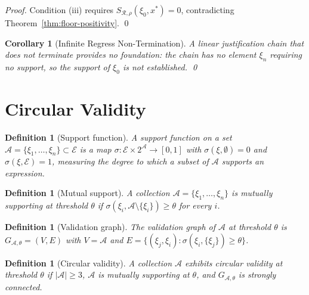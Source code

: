 \documentclass[twocolumn,a4paper]{article}
\newtheorem{corollary}[theorem]{Corollary}
\newtheorem{definition}[theorem]{Definition}
\newcommand{\Expr}{\mathcal{E}}
\newcommand{\receiver}{\mathcal{R}}
\newcommand{\Sscalar}{S}
\begin{document}
\begin{proof}
Condition (iii) requires $\Sscalar_{\receiver,\rho}(\xi_{0},x^{*})=0$, contradicting Theorem~\ref{thm:floor-positivity}. \qed
\end{proof}

\begin{corollary}[Infinite Regress Non-Termination]
\label{cor:infinite-regress}
A linear justification chain that does not terminate provides no foundation: the chain has no element $\xi_{n}$ requiring no support, so the support of $\xi_{0}$ is not established. \qed
\end{corollary}

\section{Circular Validity}
\label{sec:circular-validity}

\begin{definition}[Support function]
\label{def:support}
A \emph{support function} on a set $\mathcal{A}=\{\xi_{1},\ldots,\xi_{n}\}\subset\Expr$ is a map $\sigma\colon\Expr\times 2^{\mathcal{A}}\to[0,1]$ with $\sigma(\xi,\emptyset)=0$ and $\sigma(\xi,\Expr)=1$, measuring the degree to which a subset of $\mathcal{A}$ supports an expression.
\end{definition}

\begin{definition}[Mutual support]
\label{def:mutual-support}
A collection $\mathcal{A}=\{\xi_{1},\ldots,\xi_{n}\}$ is \emph{mutually supporting at threshold $\theta$} if $\sigma(\xi_{i},\mathcal{A}\setminus\{\xi_{i}\})\geq\theta$ for every $i$.
\end{definition}

\begin{definition}[Validation graph]
\label{def:validation-graph}
The \emph{validation graph} of $\mathcal{A}$ at threshold $\theta$ is $G_{\mathcal{A},\theta}=(V,E)$ with $V=\mathcal{A}$ and $E=\{(\xi_{j},\xi_{i})\colon\sigma(\xi_{i},\{\xi_{j}\})\geq\theta\}$.
\end{definition}

\begin{definition}[Circular validity]
\label{def:circular-validity}
A collection $\mathcal{A}$ exhibits \emph{circular validity at threshold $\theta$} if $|\mathcal{A}|\geq 3$, $\mathcal{A}$ is mutually supporting at $\theta$, and $G_{\mathcal{A},\theta}$ is strongly connected.
\end{definition}
\end{document}
